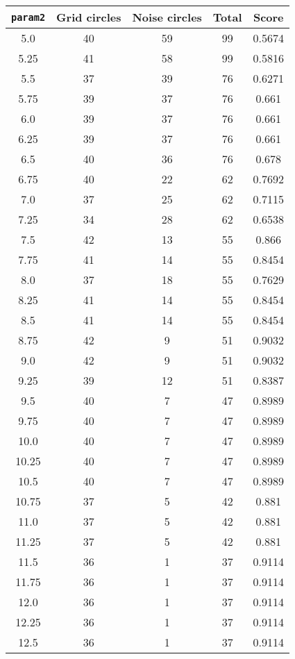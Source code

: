 \documentclass[letterpaper, 12pt]{article}
\begin{document}
\begin{longtable}{|c|c|c|c|c|}
\hline
\textbf{\texttt{param2}} & \textbf{Grid circles} & \textbf{Noise circles} & \textbf{Total} & \textbf{Score} \\
\hline
5.0 & 40 & 59 & 99 & 0.5674 \\
\hline
5.25 & 41 & 58 & 99 & 0.5816 \\
\hline
5.5 & 37 & 39 & 76 & 0.6271 \\
\hline
5.75 & 39 & 37 & 76 & 0.661 \\
\hline
6.0 & 39 & 37 & 76 & 0.661 \\
\hline
6.25 & 39 & 37 & 76 & 0.661 \\
\hline
6.5 & 40 & 36 & 76 & 0.678 \\
\hline
6.75 & 40 & 22 & 62 & 0.7692 \\
\hline
7.0 & 37 & 25 & 62 & 0.7115 \\
\hline
7.25 & 34 & 28 & 62 & 0.6538 \\
\hline
7.5 & 42 & 13 & 55 & 0.866 \\
\hline
7.75 & 41 & 14 & 55 & 0.8454 \\
\hline
8.0 & 37 & 18 & 55 & 0.7629 \\
\hline
8.25 & 41 & 14 & 55 & 0.8454 \\
\hline
8.5 & 41 & 14 & 55 & 0.8454 \\
\hline
8.75 & 42 & 9 & 51 & 0.9032 \\
\hline
9.0 & 42 & 9 & 51 & 0.9032 \\
\hline
9.25 & 39 & 12 & 51 & 0.8387 \\
\hline
9.5 & 40 & 7 & 47 & 0.8989 \\
\hline
9.75 & 40 & 7 & 47 & 0.8989 \\
\hline
10.0 & 40 & 7 & 47 & 0.8989 \\
\hline
10.25 & 40 & 7 & 47 & 0.8989 \\
\hline
10.5 & 40 & 7 & 47 & 0.8989 \\
\hline
10.75 & 37 & 5 & 42 & 0.881 \\
\hline
11.0 & 37 & 5 & 42 & 0.881 \\
\hline
11.25 & 37 & 5 & 42 & 0.881 \\
\hline
11.5 & 36 & 1 & 37 & 0.9114 \\
\hline
11.75 & 36 & 1 & 37 & 0.9114 \\
\hline
12.0 & 36 & 1 & 37 & 0.9114 \\
\hline
12.25 & 36 & 1 & 37 & 0.9114 \\
\hline
12.5 & 36 & 1 & 37 & 0.9114 \\

\end{longtable}
\end{document}
